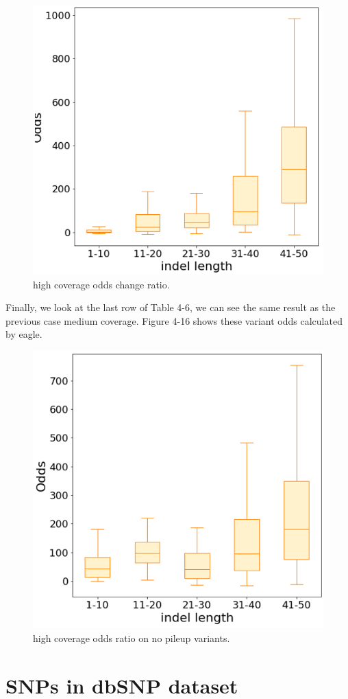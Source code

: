 \begin{figure}[H]
    \centering
    \includegraphics[width=0.6\columnwidth]{body/image/4-15.png}
    \captionsetup{labelfont=bf}
    \renewcommand{\baselinestretch}{1.0}
    \caption[high coverage odds change ratio]{high coverage odds change ratio.}
    \label{f4-15}
\end{figure}

Finally, we look at the last row of Table 4-6, we can see the same result as the previous case medium coverage. Figure 4-16 shows these variant odds calculated by eagle.

\begin{figure}[H]
    \centering
    \includegraphics[width=0.6\columnwidth]{body/image/4-16.png}
    \captionsetup{labelfont=bf}
    \renewcommand{\baselinestretch}{1.0}
    \caption[high coverage variants odds]{high coverage odds ratio on no pileup variants.}
    \label{f4-16}
\end{figure}


\section{SNPs in dbSNP dataset}

